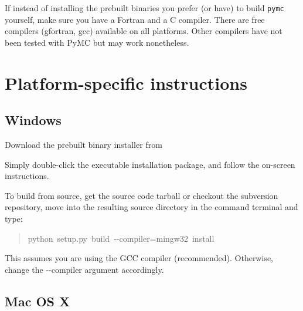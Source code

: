 If instead of installing the prebuilt binaries you prefer (or have) to build 
\texttt{pymc} yourself, make sure you have a Fortran and a C compiler. There are free
compilers (gfortran, gcc) available on all platforms. Other compilers have not been
tested with PyMC but may work nonetheless.



\hypertarget{platform-specific-instructions}{}
\section*{Platform-specific instructions}



\hypertarget{windows}{}
\subsection*{Windows}
\begin{list}{.}
{
\setlength{\rightmargin}{\leftmargin}
}
\item {} 
Download the prebuilt binary installer from

\item {} 
Simply double-click the executable installation package, and follow the on-screen instructions.

\end{list}

To build from source, get the source code tarball or checkout the subversion
repository, move into the resulting source directory in the command terminal 
and type:
\begin{quote}{\ttfamily \raggedright \noindent
python~setup.py~build~-{}-compiler=mingw32~install
}\end{quote}

This assumes you are using the GCC compiler (recommended). Otherwise, 
change the -{}-compiler argument accordingly.



\hypertarget{mac-os-x}{}
\subsection*{Mac OS X}

